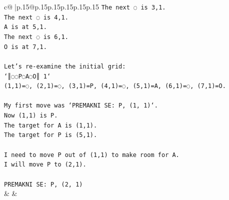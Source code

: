 \documentclass{article}
\begin{document}
{\begin{supertabular}{c@{$\;$}|p{.15\linewidth}@{}p{.15\linewidth}p{.15\linewidth}p{.15\linewidth}p{.15\linewidth}p{.15\linewidth}}
{{{\texttt{The next ◌ is 3,1.} \\
\texttt{The next ◌ is 4,1.} \\
\texttt{A is at 5,1.} \\
\texttt{The next ◌ is 6,1.} \\
\texttt{O is at 7,1.} \\
\\ 
\texttt{Let's re{-}examine the initial grid:} \\
\texttt{`║◌◌P◌A◌O║ 1`} \\
\texttt{(1,1)=◌, (2,1)=◌, (3,1)=P, (4,1)=◌, (5,1)=A, (6,1)=◌, (7,1)=O.} \\
\\ 
\texttt{My first move was `PREMAKNI SE: P, (1, 1)`.} \\
\texttt{Now (1,1) is P.} \\
\texttt{The target for A is (1,1).} \\
\texttt{The target for P is (5,1).} \\
\\ 
\texttt{I need to move P out of (1,1) to make room for A.} \\
\texttt{I will move P to (2,1).} \\
\\ 
\texttt{PREMAKNI SE: P, (2, 1)} \\
            }
        }
    }
    & & \\ \\


\end{supertabular}}
\end{document}
